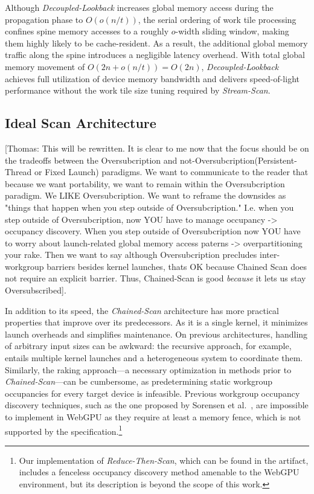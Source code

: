 \documentclass[sigconf]{acmart}
\newcommand{\thomas}[1]{{\footnotesize\color{orange}[Thomas: #1]}}
\begin{document}
Although \emph{Decoupled-Lookback} increases global memory access during the propagation phase to $O(o(n/t))$, the serial ordering of work tile processing confines spine memory accesses to a roughly $o$-width sliding window, making them highly likely to be cache-resident. As a result, the additional global memory traffic along the spine introduces a negligible latency overhead. With total global memory movement of $O(2n+o(n/t))= O(2n)$, \emph{Decoupled-Lookback} achieves full utilization of device memory bandwidth and delivers speed-of-light performance without the work tile size tuning required by \emph{Stream-Scan}.

\subsection{Ideal Scan Architecture}
\thomas{This will be rewritten. It is clear to me now that the focus should be on the tradeoffs between the Oversubcription and not-Oversubcription(Persistent-Thread or Fixed Launch) paradigms. We want to communicate to the reader that because we want portability, we want to remain within the Oversubcription paradigm. We LIKE Oversubcription. We want to reframe the downsides as "things that happen when you step outside of Oversubcription." I.e. when you step outside of Oversubcription, now YOU have to manage occupancy -> occupancy discovery. When you step outside of Oversubcription now YOU have to worry about launch-related global memory access paterns -> overpartitioning your rake. Then we want to say although Oversubcription precludes inter-workgroup barriers besides kernel launches, thats OK because Chained Scan does not require an explicit barrier. Thus, Chained-Scan is good \emph{because} it lets us stay Oversubscribed}.

In addition to its speed, the \emph{Chained-Scan} architecture has more practical properties that improve over its predecessors. As it is a single kernel, it minimizes launch overheads and simplifies maintenance. On previous architectures, handling of arbitrary input sizes can be awkward: the recursive approach, for example, entails multiple kernel launches and a heterogeneous system to coordinate them. Similarly, the raking approach—a necessary optimization in methods prior to \emph{Chained-Scan}—can be cumbersome, as predetermining static workgroup occupancies for every target device is infeasible. Previous workgroup occupancy discovery techniques, such as the one proposed by Sorensen et al.~\cite{}, are impossible to implement in WebGPU as they require at least a memory fence, which is not supported by the specification.\footnote{Our implementation of \emph{Reduce-Then-Scan}, which can be found in the artifact, includes a fenceless occupancy discovery method amenable to the WebGPU environment, but its description is beyond the scope of this work.}
\end{document}
